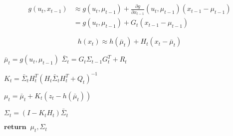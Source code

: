 \begin{align*}
    g(u_t, x_{t-1}) & \approx g(u_t, \mu_{t-1}) + \frac{\partial g}{\partial x_{t-1}}(u_t, \mu_{t-1})(x_{t-1} - \mu_{t-1}) \\
    & = g(u_t, \mu_{t-1}) + G_t(x_{t-1} - \mu_{t-1})
\end{align*}

\[
h(x_t) \approx h(\bar{\mu}_t) + H_t(x_t - \bar{\mu}_t)
\]





\begin{algorithm}
    \renewcommand{\thealgorithm}{}
    \begin{algorithmic}[1]
        \State $\bar{\mu}_t = g(u_t, \mu_{t-1})$
        \State $\bar{\Sigma}_t = G_t\Sigma_{t-1}G_t^T + R_t$

        \State $K_t = \bar{\Sigma}_t H_t^T (H_t \bar{\Sigma}_t  H_t^T + Q_t)^{-1}$

        \State $\mu_t = \bar{\mu}_t + K_t(z_t - h(\bar{\mu}_t))$

        \State $\Sigma_t = (I - K_tH_t) \bar{\Sigma}_t$

        \State $\textbf{return} \;\; \mu_t, \Sigma_t$
        \EndFunction

    \end{algorithmic}
\end{algorithm}




